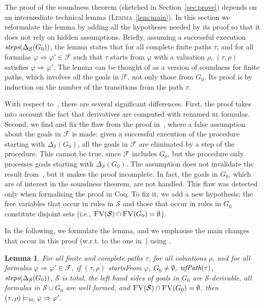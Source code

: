 \documentclass[conference]{IEEEtran}
\newcommand{\F}{\mathcal{F}}
\renewcommand{\S}{\mathcal{S}}
\newcommand{\Ra}{\Rightarrow}
\newcommand{\FreeVars}{\mathit{\textsc{FV}}}
\newcommand{\RL}{\textsc{rl}\xspace}
\newcommand{\rrule}[2]{{#1} \Ra{#2}}
\newcommand{\modelsrl}{\models_\RL}
\newcommand{\coq}[1]{{\small \textit{#1}}}
\newtheorem{lemma}{Lemma}
\newcommand{\hl}[1]{\hlt{#1}}
\begin{document}
The proof of the soundness theorem (sketched in Section~\ref{sec:prove}) depends on an intermediate technical lemma (\textsc{Lemma}~\ref{lem:main}).
In this section we reformulate the lemma by adding all the hypotheses needed by its proof so that it does not rely on hidden assumptions. 
Briefly, assuming a successful execution $\coq{steps}(\Delta_\S(G_0))$, the lemma states that for all complete finite paths $\tau$, and for all formulas $\rrule{\varphi}{\varphi'}\in\F$ such that $\tau$ starts from $\varphi$ with a valuation $\rho$, $(\tau, \rho)$ satisfies $\rrule{\varphi}{\varphi'}$.
The lemma can be thought of as a version of soundness for finite paths, which involves all the goals in $\F$, not only those from $G_0$.
Its proof is by induction on the number of the transitions from the path $\tau$.



With respect to~\cite{lucanu-rusu-arusoaie-nowak-LRC2015}, there are several significant differences.
First, the proof takes into account the fact that derivatives are computed with renamed \RL formulas.
Second, we find and fix the flaw from the proof in~\cite{lucanu-rusu-arusoaie-nowak-LRC2015}, 
where a false assumption about the goals in $\F$ is made: given a successful execution of the procedure starting with $\Delta_\S(G_0)$, all the goals in $\F$ are eliminated by a step of the procedure.
This cannot be true, since $\F$ includes $G_0$, but the procedure only processes goals starting with $\Delta_\S(G_0)$.
The assumption does not invalidate the result from~\cite{lucanu-rusu-arusoaie-nowak-LRC2015}, but it makes the proof incomplete. 
In fact, the goals in $G_0$, which are of interest in the soundness theorem, are not handled.
This flaw was detected only when formalising the proof in Coq. 
To fix it, we add a new hypothesis: the free variables that occur in rules in $\S$ and those that occur in rules in $G_0$ constitute disjoint sets (i.e., $\FreeVars(\S) \cap \FreeVars(G_0) = \emptyset$).


In the following, we formulate the lemma, and we emphasise the main changes that occur in this proof (w.r.t. to the one in~\cite{lucanu-rusu-arusoaie-nowak-LRC2015}) using {\hl{gray font}}. 




\begin{lemma}
\label{lem:finite}
For all finite and complete paths $\tau$, for all valuations $\rho$, and for all formulas $\rrule{\varphi}{\varphi'}\in\F$, 
if 
$(\tau,\rho)$ \coq{startsFrom} $\varphi$, 
$G_0 \neq \emptyset$, 
$\coq{wfPath}(\tau)$, 
$\coq{steps}(\Delta_\S(G_0))$, 
$\S$ is \coq{total}, 
the left hand sides of goals in $G_0$ are $\S$-derivable,
all formulas in $\S \cup G_0$ are well formed,
and $\FreeVars(\S) \cap \FreeVars(G_0) = \emptyset$,
then $(\tau,\rho)\modelsrl \rrule{\varphi}{\varphi'}$.
\end{lemma}
\end{document}
